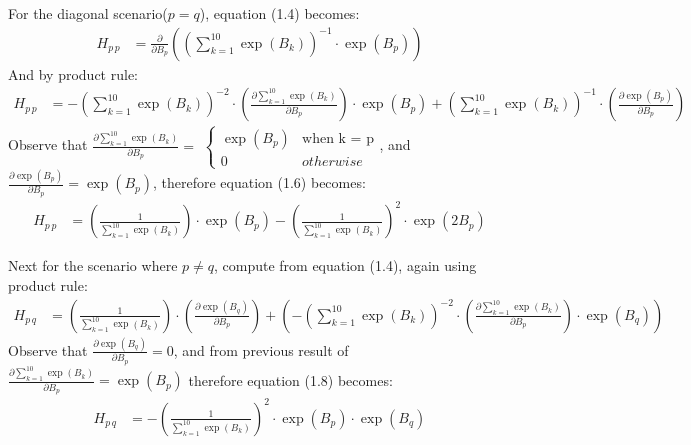 \documentclass[12pt]{article}
\numberwithin{equation}{section}
\theoremstyle{remark}
\begin{document}
\medskip
For the diagonal scenario($p = q$), equation (1.4) becomes:
\begin{align}
H_{p\,p} &= \frac{\partial}{\partial B_{p}}\left(\left(\sum\limits_{k = 1}^{10} \exp \left( B_{k} \right)\right)^{-1}\cdot\exp \left( B_{p} \right)\right)
\end{align}
And by product rule:
\begin{align}
H_{p\,p} &= -\left(\sum\limits_{k = 1}^{10} \exp \left( B_{k} \right)\right)^{-2}\cdot\left(\frac{\partial\sum\limits_{k = 1}^{10} \exp \left( B_{k} \right)}{\partial B_{p}}\right)\cdot\exp \left( B_{p} \right) + \left(\sum\limits_{k = 1}^{10} \exp \left( B_{k} \right)\right)^{-1}\cdot\left(\frac{\partial \exp \left( B_{p} \right)}{\partial B_{p}}\right)
\end{align}
Observe that $\frac{\partial\sum\limits_{k = 1}^{10} \exp \left( B_{k} \right)}{\partial B_{p}} = $ \begin{math}
    \left\{
    \begin{array}{ll}
      \exp \left( B_{p} \right) & \mbox{when k = p} \\
      0 & otherwise
    \end{array}
    \right.
    \end{math}, and $\frac{\partial \exp \left( B_{p} \right)}{\partial B_{p}} = \exp \left( B_{p} \right)$, therefore equation (1.6) becomes:
\begin{align}
H_{p\,p} &= \left(\frac{1}{\sum\limits_{k = 1}^{10} \exp \left( B_{k} \right)}\right)\cdot\exp \left( B_{p} \right) - \left(\frac{1}{\sum\limits_{k = 1}^{10} \exp \left( B_{k} \right)}\right)^2\cdot\exp \left( 2B_{p} \right)
\end{align}

\medskip
Next for the scenario where $p \neq q$, compute from equation (1.4), again using product rule:
\begin{align}
H_{p\,q} &= \left(\frac{1}{\sum\limits_{k = 1}^{10} \exp \left( B_{k} \right)}\right)\cdot\left(\frac{\partial \exp \left( B_{q} \right)}{\partial B_{p}}\right) + \left(-\left(\sum\limits_{k = 1}^{10} \exp \left( B_{k} \right)\right)^{-2}\cdot\left(\frac{\partial\sum\limits_{k = 1}^{10} \exp \left( B_{k} \right)}{\partial B_{p}}\right)\cdot\exp \left( B_{q} \right)\right)
\end{align}
Observe that $\frac{\partial \exp \left( B_{q} \right)}{\partial B_{p}} = 0$, and from previous result of $\frac{\partial\sum\limits_{k = 1}^{10} \exp \left( B_{k} \right)}{\partial B_{p}} = \exp(B_{p})$  therefore equation (1.8) becomes:
\begin{align}
H_{p\,q} &= -\left(\frac{1}{\sum\limits_{k = 1}^{10} \exp \left( B_{k} \right)}\right)^{2}\cdot\exp \left( B_{p} \right)\cdot\exp \left( B_{q} \right)
\end{align}
\end{document}
